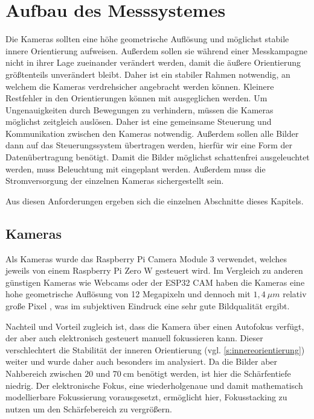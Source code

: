 \documentclass[./00_PhotoBox.tex]{subfiles}
\begin{document}
\chapter{Aufbau des Messsystemes}
Die Kameras sollten eine höhe geometrische Auflösung und möglichst stabile innere Orientierung aufweisen. Außerdem sollen sie während einer Messkampagne nicht in ihrer Lage zueinander verändert werden, damit die äußere Orientierung größtenteils unverändert bleibt. Daher ist ein stabiler Rahmen notwendig, an welchem die Kameras verdrehsicher angebracht werden können. Kleinere Restfehler in den Orientierungen können mit ausgeglichen werden.
Um Ungenauigkeiten durch Bewegungen zu verhindern, müssen die Kameras möglichst zeitgleich auslösen. Daher ist eine gemeinsame Steuerung und Kommunikation zwischen den Kameras notwendig. Außerdem sollen alle Bilder dann auf das Steuerungssystem übertragen werden, hierfür wir eine Form der Datenübertragung benötigt. Damit die Bilder möglichst schattenfrei ausgeleuchtet werden, muss Beleuchtung mit eingeplant werden. Außerdem muss die Stromversorgung der einzelnen Kameras sichergestellt sein.

Aus diesen Anforderungen ergeben sich die einzelnen Abschnitte dieses Kapitels.

\section{Kameras}
Als Kameras wurde das Raspberry Pi Camera Module 3 verwendet, welches jeweils von einem Raspberry Pi Zero W gesteuert wird. Im Vergleich zu anderen günstigen Kameras wie Webcams oder der ESP32 CAM haben die Kameras eine hohe geometrische Auflösung von 12 Megapixeln und dennoch mit $1,4~\mu m$ relativ große Pixel \citep{raspi_cam_datasheet}, was im subjektiven Eindruck eine sehr gute Bildqualität ergibt.

Nachteil und Vorteil zugleich ist, dass die Kamera über einen Autofokus verfügt, der aber auch elektronisch gesteuert manuell fokussieren kann. Dieser verschlechtert die Stabilität der inneren Orientierung (vgl. \autoref{s:innereorientierung}) weiter und wurde daher auch besonders im  analysiert. Da die Bilder aber Nahbereich zwischen $20$ und $70~\text{cm}$ benötigt werden, ist hier die Schärfentiefe niedrig. Der elektronische Fokus, eine wiederholgenaue und damit mathematisch modellierbare Fokussierung vorausgesetzt, ermöglicht hier, Fokusstacking zu nutzen um den Schärfebereich zu vergrößern.
\end{document}
